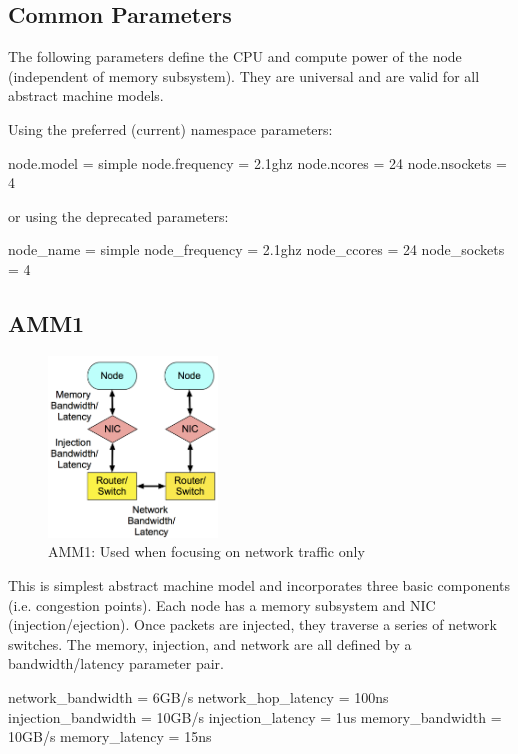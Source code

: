 \subsection{Common Parameters}
The following parameters define the CPU and compute power of the node (independent of memory subsystem).
They are universal and are valid for all abstract machine models.

Using the preferred (current) namespace parameters:
\begin{ViFile}
node.model = simple
node.frequency = 2.1ghz
node.ncores = 24
node.nsockets = 4
\end{ViFile}

or using the deprecated parameters:
\begin{ViFile}
node_name = simple
node_frequency = 2.1ghz
node_ccores = 24
node_sockets = 4
\end{ViFile}

\subsection{AMM1}
\label{subsec:ammOne}

\begin{figure}[h!]
\begin{center}
\includegraphics[width=0.4\textwidth]{figures/amm/AMM1.png}
\end{center}
\caption{AMM1: Used when focusing on network traffic only}
\label{fig:amm1}
\end{figure}

This is simplest abstract machine model and incorporates three basic components (i.e. congestion points).
Each node has a memory subsystem and NIC (injection/ejection).
Once packets are injected, they traverse a series of network switches.
The memory, injection, and network are all defined by a bandwidth/latency parameter pair.

\begin{ViFile}
network_bandwidth = 6GB/s
network_hop_latency = 100ns
injection_bandwidth = 10GB/s
injection_latency = 1us
memory_bandwidth = 10GB/s
memory_latency = 15ns
\end{ViFile}

